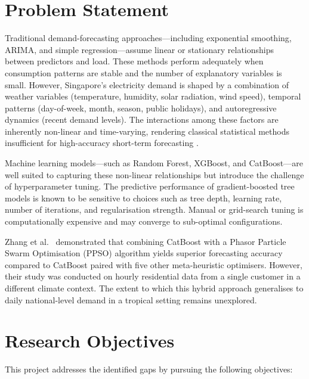 \section{Problem Statement}

Traditional demand-forecasting approaches---including exponential smoothing, ARIMA, and simple regression---assume linear or stationary relationships between predictors and load. These methods perform adequately when consumption patterns are stable and the number of explanatory variables is small. However, Singapore's electricity demand is shaped by a combination of weather variables (temperature, humidity, solar radiation, wind speed), temporal patterns (day-of-week, month, season, public holidays), and autoregressive dynamics (recent demand levels). The interactions among these factors are inherently non-linear and time-varying, rendering classical statistical methods insufficient for high-accuracy short-term forecasting \parencite{almusaylh2018forecasting}.

Machine learning models---such as Random Forest, XGBoost, and CatBoost---are well suited to capturing these non-linear relationships but introduce the challenge of hyperparameter tuning. The predictive performance of gradient-boosted tree models is known to be sensitive to choices such as tree depth, learning rate, number of iterations, and regularisation strength. Manual or grid-search tuning is computationally expensive and may converge to sub-optimal configurations.

Zhang et al.\ \parencite{zhang2023catboostppso} demonstrated that combining CatBoost with a Phasor Particle Swarm Optimisation (PPSO) algorithm yields superior forecasting accuracy compared to CatBoost paired with five other meta-heuristic optimisers. However, their study was conducted on hourly residential data from a single customer in a different climate context. The extent to which this hybrid approach generalises to daily national-level demand in a tropical setting remains unexplored.


\section{Research Objectives}

This project addresses the identified gaps by pursuing the following objectives:

